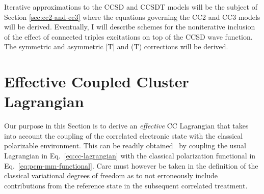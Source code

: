 Iterative approximations to the \acrshort{CCSD} and \acrshort{CCSDT} models will
be the subject of Section \ref{sec:cc2-and-cc3} where the equations
governing the \acrshort{CC2} and \acrshort{CC3} models will be derived.
Eventually, I will describe schemes for the noniterative inclusion of
the effect of connected triples excitations on top of
the \acrshort{CCSD} wave function. The symmetric and asymmetric [T] and (T)
corrections will be derived.

\section{Effective Coupled Cluster Lagrangian}
\label{sec:effective-cc-lagrangian}

Our purpose in this Section is to derive an \emph{effective} \acrshort{CC}
Lagrangian that takes into account the coupling of the correlated
electronic state with the classical polarizable
environment.
This can be readily obtained~\autocite{Lipparini2016-mo} by coupling the
usual Lagrangian in Eq.~\eqref{eq:cc-lagrangian} with the classical
polarization functional in Eq.~\eqref{eq:pcm-mm-functional}.
Care must however be taken in the definition of the classical
variational degrees of freedom as to not erroneously include
contributions from the reference state in the subsequent correlated
treatment.

